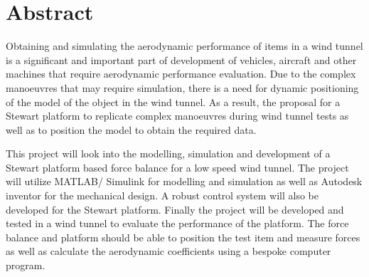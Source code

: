 
\section*{Abstract}
\label{sec:Abstract}
Obtaining and simulating the aerodynamic performance of items in a wind tunnel is a
significant and important part of development of vehicles, aircraft and other machines
that require aerodynamic performance evaluation. Due to the complex manoeuvres
that may require simulation, there is a need for dynamic positioning of the model of the object in the wind tunnel. As a result, the proposal for a Stewart platform to
replicate complex manoeuvres during wind tunnel tests as well as to position the model to
obtain the required data.

This project will look into the modelling, simulation and development of a Stewart
platform based force balance for a low speed wind tunnel. The project will utilize
MATLAB/ Simulink for modelling and simulation as well as Autodesk inventor for the mechanical
design. A robust control system will also be developed for the Stewart platform.
Finally the project will be developed and tested in a wind tunnel to evaluate the performance
of the platform. The force balance and platform should be able to position the test
item and measure forces as well as calculate the aerodynamic coefficients using a bespoke computer program.




